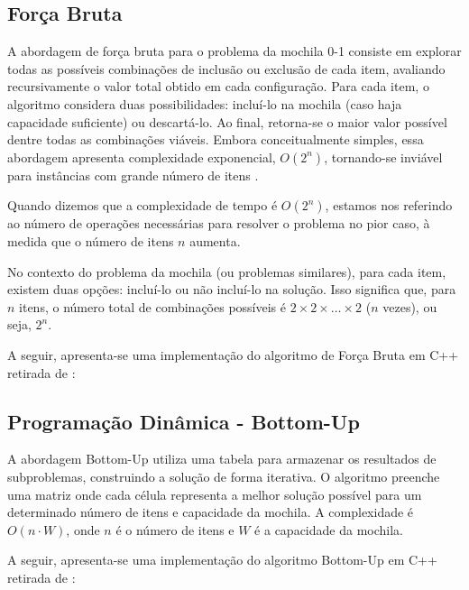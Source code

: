 \subsection{Força Bruta}
A abordagem de força bruta para o problema da mochila 0-1 consiste em explorar todas as possíveis combinações de inclusão ou exclusão de cada item,
avaliando recursivamente o valor total obtido em cada configuração. Para cada item, o algoritmo considera duas possibilidades:
incluí-lo na mochila (caso haja capacidade suficiente) ou descartá-lo.
Ao final, retorna-se o maior valor possível dentre todas as combinações viáveis. Embora conceitualmente simples, essa abordagem apresenta complexidade exponencial, \(O(2^n)\),
tornando-se inviável para instâncias com grande número de itens \cite{geeksForGeeks-knapsack}.

Quando dizemos que a complexidade de tempo é $O(2^n)$, estamos nos referindo ao número de operações necessárias para resolver o problema no pior caso, à medida que o número de itens $n$ aumenta.

No contexto do problema da mochila (ou problemas similares), para cada item, existem duas opções: incluí-lo ou não incluí-lo na solução. Isso significa que, para $n$ itens, o número total de combinações possíveis é $2 \times 2 \times \ldots \times 2$ ($n$ vezes), ou seja, $2^n$.

A seguir, apresenta-se uma implementação do algoritmo de Força Bruta em C++ retirada de \cite{geeksForGeeks-knapsack}:



\subsection{Programação Dinâmica - Bottom-Up}
A abordagem Bottom-Up utiliza uma tabela para armazenar os resultados de subproblemas, construindo a solução de forma iterativa.
O algoritmo preenche uma matriz onde cada célula representa a melhor solução possível para um determinado número de itens e capacidade da mochila.
A complexidade é \(O(n \cdot W)\), onde \(n\) é o número de itens e \(W\) é a capacidade da mochila.

A seguir, apresenta-se uma implementação do algoritmo Bottom-Up em C++ retirada de \cite{geeksForGeeks-knapsack}:





